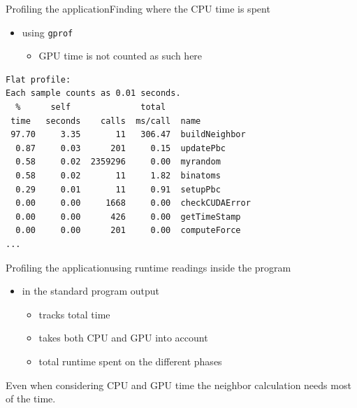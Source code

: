 \documentclass[ignorenonframetext,aspectratio=169]{beamer}
\begin{document}
\begin{frame}[fragile]{Profiling the application}{Finding where the CPU time is spent}
    \begin{itemize}
    	\item using \texttt{gprof}
    	\begin{itemize}
    		\item GPU time is not counted as such here
    	\end{itemize}
    \end{itemize}

    \begin{verbatim}
Flat profile:
Each sample counts as 0.01 seconds.
  %      self              total           
 time   seconds    calls  ms/call  name    
 97.70     3.35       11   306.47  buildNeighbor
  0.87     0.03      201     0.15  updatePbc
  0.58     0.02  2359296     0.00  myrandom
  0.58     0.02       11     1.82  binatoms
  0.29     0.01       11     0.91  setupPbc
  0.00     0.00     1668     0.00  checkCUDAError
  0.00     0.00      426     0.00  getTimeStamp
  0.00     0.00      201     0.00  computeForce
...
    \end{verbatim}
\end{frame}

\begin{frame}[fragile]{Profiling the application}{using runtime readings inside the program}
\vspace{-4\baselineskip}
    \begin{itemize}
    	\item in the standard program output
    	\begin{itemize}
    		\item tracks total time
    		\item takes both CPU and GPU into account
    		\item total runtime spent on the different phases
    	\end{itemize}
    \end{itemize}
    
    Even when considering CPU and GPU time the neighbor calculation needs most of the time.
\end{frame}
\end{document}

